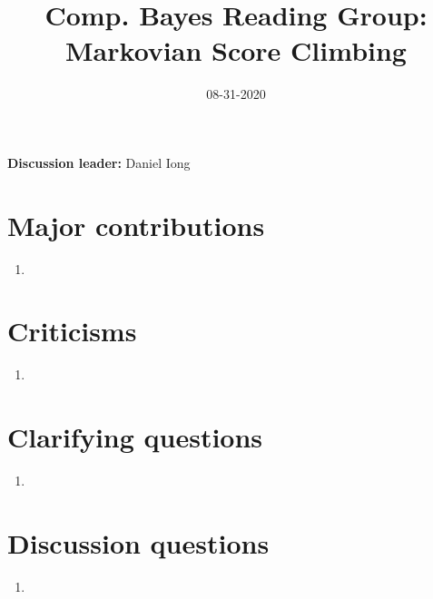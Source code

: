 \documentclass{article}
\title{\textbf{Comp. Bayes Reading Group}: \\ 
Markovian Score Climbing \vspace{-.3in}}
\date{08-31-2020}
\begin{document}
\maketitle

\textbf{Discussion leader: } Daniel Iong

\section{Major contributions}

\begin{enumerate}
    \item 
\end{enumerate}

\section{Criticisms}

\begin{enumerate}
    \item 
\end{enumerate}

\section{Clarifying questions}

\begin{enumerate}
    \item 
\end{enumerate}

\section{Discussion questions}

\begin{enumerate}
    \item 
\end{enumerate}
\end{document}
